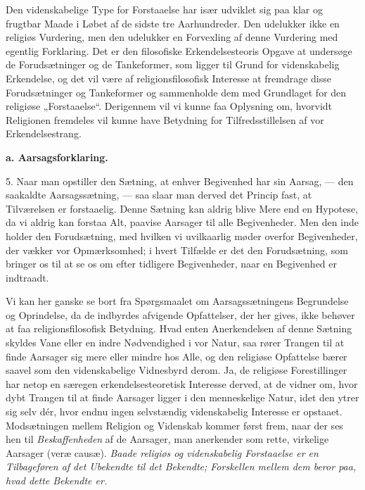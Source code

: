 \documentclass[12pt,a4paper,openany]{book}
\newcommand{\opage}[1]{\marginnote{\footnotesize\textit{[#1]}}}
\begin{document}
Den videnskabelige Type for Forstaaelse har især udviklet sig paa klar
og frugtbar Maade i Løbet af de sidste tre Aarhundreder. Den udelukker
ikke en religiøs Vurdering, men den udelukker en Forvexling af denne
Vurdering med egentlig Forklaring. Det er den filosofiske
Erkendelsesteoris Opgave at undersøge de Forudsætninger og de
Tankeformer, som ligger til Grund for videnskabelig Erkendelse, og det
vil være af religionsfilosofisk Interesse at fremdrage disse
Forudsætninger og Tankeformer og sammenholde dem med Grundlaget for den
religiøse „Forstaaelse“. Derigennem vil vi kunne faa Oplysning om,
hvorvidt Religionen fremdeles vil kunne have Betydning for
Tilfredsstillelsen af vor Erkendelsestrang.

\begin{center}\textbf{a. Aarsagsforklaring.}\end{center}

5. Naar man opstiller den Sætning, at enhver Begivenhed har sin Aarsag,
--- den saakaldte Aarsagssætning, --- saa slaar man derved det Princip
fast, at Tilværelsen er forstaaelig. Denne Sætning kan aldrig blive Mere
end en Hypotese, da vi aldrig kan forstaa Alt, paavise Aarsager til alle
Begivenheder. Men den inde%
\opage{18}holder den Forudsætning, med hvilken vi uvilkaarlig møder
overfor Begivenheder, der vækker vor Opmærksomhed; i hvert Tilfælde er
det den Forudsætning, som bringer os til at se os om efter tidligere
Begivenheder, naar en Begivenhed er indtraadt.

Vi kan her ganske se bort fra Spørgsmaalet om Aarsagssætningens
Begrundelse og Oprindelse, da de indbyrdes afvigende Opfattelser, der
her gives, ikke behøver at faa religionsfilosofisk Betydning. Hvad enten
Anerkendelsen af denne Sætning skyldes Vane eller en indre Nødvendighed
i vor Natur, saa rører Trangen til at finde Aarsager sig mere eller
mindre hos Alle, og den religiøse Opfattelse bærer saavel som den
videnskabelige Vidnesbyrd derom. Ja, de religiøse Forestillinger har
netop en særegen erkendelsesteoretisk Interesse derved, at de vidner om,
hvor dybt Trangen til at finde Aarsager ligger i den menneskelige Natur,
idet den ytrer sig selv dér, hvor endnu ingen selvstændig videnskabelig
Interesse er opstaaet. Modsætningen mellem Religion og Videnskab kommer
først frem, naar der ses hen til \textit{Beskaffenheden} af de Aarsager,
man anerkender som rette, virkelige Aarsager (veræ causæ). \textit{Baade
religiøs og videnskabelig Forstaaelse er en Tilbageføren af det
Ubekendte til det Bekendte; Forskellen mellem dem beror paa, hvad dette
Bekendte er.}
\end{document}
